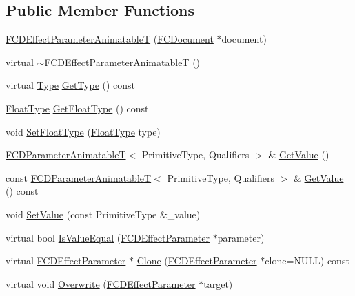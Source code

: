 \subsection*{Public Member Functions}
\begin{DoxyCompactItemize}
\item 
\hyperlink{classFCDEffectParameterAnimatableT_a5cf262b2959b4536f8e434600b3e8d45}{FCDEffectParameterAnimatableT} (\hyperlink{classFCDocument}{FCDocument} $\ast$document)
\item 
virtual \hyperlink{classFCDEffectParameterAnimatableT_a1c7fc2c46f69476898aa002bcec78df4}{$\sim$FCDEffectParameterAnimatableT} ()
\item 
virtual \hyperlink{classFCDEffectParameter_a1efe74553d2ed199435085c171743b08}{Type} \hyperlink{classFCDEffectParameterAnimatableT_a5c9927e0ec4e8ab4c53f64c9a9490b20}{GetType} () const 
\item 
\hyperlink{classFCDEffectParameterAnimatableT_a8cc624ded1c773fd65851d213573e8b1}{FloatType} \hyperlink{classFCDEffectParameterAnimatableT_a8d67ba29be54209efc203539e47a5126}{GetFloatType} () const 
\item 
void \hyperlink{classFCDEffectParameterAnimatableT_a301ec52a4c64cada628b9cc4a8b10583}{SetFloatType} (\hyperlink{classFCDEffectParameterAnimatableT_a8cc624ded1c773fd65851d213573e8b1}{FloatType} type)
\item 
\hyperlink{classFCDParameterAnimatableT}{FCDParameterAnimatableT}$<$ PrimitiveType, Qualifiers $>$ \& \hyperlink{classFCDEffectParameterAnimatableT_ade9b28bef76882f7be35a199f03dc91d}{GetValue} ()
\item 
const \hyperlink{classFCDParameterAnimatableT}{FCDParameterAnimatableT}$<$ PrimitiveType, Qualifiers $>$ \& \hyperlink{classFCDEffectParameterAnimatableT_a2dd24784bc0f3db4215ce7cf8b63934f}{GetValue} () const 
\item 
void \hyperlink{classFCDEffectParameterAnimatableT_a14593ca8b6b7cba38b3e2a7d99e5f81c}{SetValue} (const PrimitiveType \&\_\-value)
\item 
virtual bool \hyperlink{classFCDEffectParameterAnimatableT_a490bf049e84d5c75ae60b4c5256aee5c}{IsValueEqual} (\hyperlink{classFCDEffectParameter}{FCDEffectParameter} $\ast$parameter)
\item 
virtual \hyperlink{classFCDEffectParameter}{FCDEffectParameter} $\ast$ \hyperlink{classFCDEffectParameterAnimatableT_a810e39c7a3824cf55828197ce0befa79}{Clone} (\hyperlink{classFCDEffectParameter}{FCDEffectParameter} $\ast$clone=NULL) const 
\item 
virtual void \hyperlink{classFCDEffectParameterAnimatableT_a6645b1e1d7ccef7505b7912b22f9deb9}{Overwrite} (\hyperlink{classFCDEffectParameter}{FCDEffectParameter} $\ast$target)
\end{DoxyCompactItemize}


